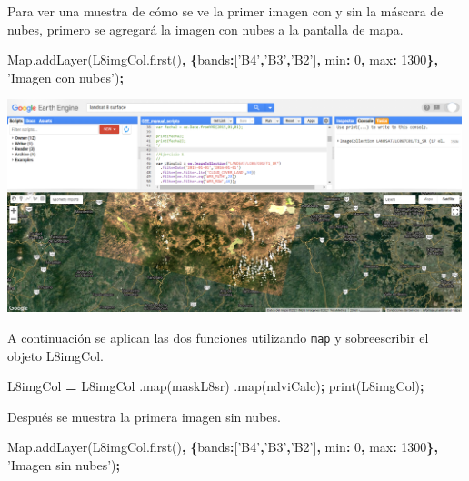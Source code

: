 \documentclass[
]{article}
\newenvironment{Shaded}{\begin{snugshade}}{\end{snugshade}}
\newcommand{\AttributeTok}[1]{\textcolor[rgb]{0.77,0.63,0.00}{#1}}
\newcommand{\DataTypeTok}[1]{\textcolor[rgb]{0.13,0.29,0.53}{#1}}
\newcommand{\DecValTok}[1]{\textcolor[rgb]{0.00,0.00,0.81}{#1}}
\newcommand{\NormalTok}[1]{#1}
\newcommand{\OperatorTok}[1]{\textcolor[rgb]{0.81,0.36,0.00}{\textbf{#1}}}
\newcommand{\StringTok}[1]{\textcolor[rgb]{0.31,0.60,0.02}{#1}}
\newcommand{\VariableTok}[1]{\textcolor[rgb]{0.00,0.00,0.00}{#1}}
\begin{document}
Para ver una muestra de cómo se ve la primer imagen con y sin la máscara
de nubes, primero se agregará la imagen con nubes a la pantalla de mapa.

\begin{Shaded}
\begin{Highlighting}[]
\VariableTok{Map}\NormalTok{.}\AttributeTok{addLayer}\NormalTok{(}\VariableTok{L8imgCol}\NormalTok{.}\AttributeTok{first}\NormalTok{()}\OperatorTok{,} 
  \OperatorTok{\{}\DataTypeTok{bands}\OperatorTok{:}\NormalTok{[}\StringTok{'B4'}\OperatorTok{,}\StringTok{'B3'}\OperatorTok{,}\StringTok{'B2'}\NormalTok{]}\OperatorTok{,} \DataTypeTok{min}\OperatorTok{:} \DecValTok{0}\OperatorTok{,} \DataTypeTok{max}\OperatorTok{:} \DecValTok{1300}\OperatorTok{\},}
  \StringTok{'Imagen con nubes'}\NormalTok{)}\OperatorTok{;}
\end{Highlighting}
\end{Shaded}

\includegraphics[width=500px]{Img/imNubes}

A continuación se aplican las dos funciones utilizando \texttt{map} y
sobreescribir el objeto L8imgCol.

\begin{Shaded}
\begin{Highlighting}[]
\NormalTok{L8imgCol }\OperatorTok{=}\NormalTok{ L8imgCol}
\NormalTok{  .}\AttributeTok{map}\NormalTok{(maskL8sr)}
\NormalTok{  .}\AttributeTok{map}\NormalTok{(ndviCalc)}\OperatorTok{;}
\AttributeTok{print}\NormalTok{(L8imgCol)}\OperatorTok{;}
\end{Highlighting}
\end{Shaded}

Después se muestra la primera imagen sin nubes.

\begin{Shaded}
\begin{Highlighting}[]
\VariableTok{Map}\NormalTok{.}\AttributeTok{addLayer}\NormalTok{(}\VariableTok{L8imgCol}\NormalTok{.}\AttributeTok{first}\NormalTok{()}\OperatorTok{,} 
  \OperatorTok{\{}\DataTypeTok{bands}\OperatorTok{:}\NormalTok{[}\StringTok{'B4'}\OperatorTok{,}\StringTok{'B3'}\OperatorTok{,}\StringTok{'B2'}\NormalTok{]}\OperatorTok{,} \DataTypeTok{min}\OperatorTok{:} \DecValTok{0}\OperatorTok{,} \DataTypeTok{max}\OperatorTok{:} \DecValTok{1300}\OperatorTok{\},}
  \StringTok{'Imagen sin nubes'}\NormalTok{)}\OperatorTok{;}
\end{Highlighting}
\end{Shaded}
\end{document}
